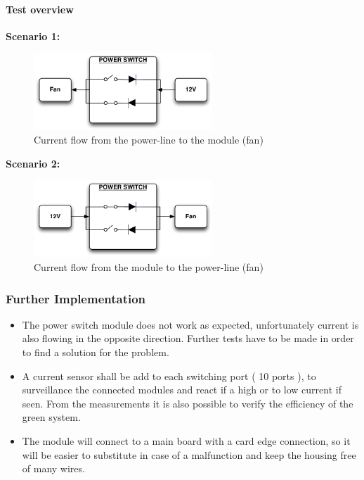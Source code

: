 \paragraph{Test overview}
\textbf{Scenario 1:}
\begin{figure}[H]
	\begin{centering}
		\includegraphics[width=0.6\textwidth,page=1]{images/scenario1.pdf}
		\caption{Current flow from the power-line to the module (fan)}
	\end{centering}
\end{figure}
\textbf{Scenario 2:}
\begin{figure}[H]
	\begin{centering}
		\includegraphics[width=0.6\textwidth,page=1]{images/scenario2.pdf}
		\caption{Current flow from the module to the power-line (fan)}
	\end{centering}
\end{figure}
\subsubsection{Further Implementation}
\begin{itemize}
	\item The power switch module does not work as expected, unfortunately current is also flowing in the opposite direction. Further tests have to be made in order to find a solution for the problem.
	\item A current sensor shall be add to each switching port ( 10 ports ), to surveillance the connected modules and react if a high or to low current if seen. From the measurements it is also possible to verify the efficiency of the green system.
	\item The module will connect to a main board with a card edge connection, so it will be easier to substitute in case of a malfunction and keep the housing free of many wires.
\end{itemize}


